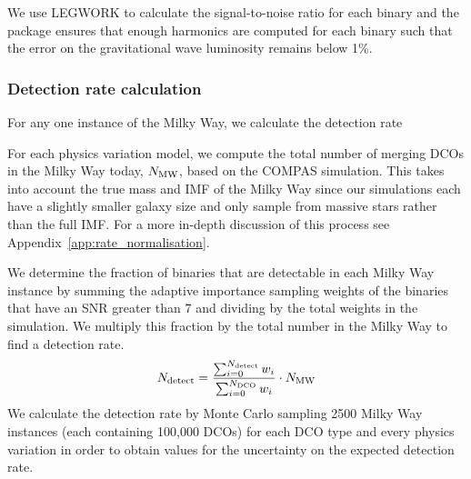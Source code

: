 We use LEGWORK to calculate the signal-to-noise ratio for each binary and the package ensures that enough harmonics are computed for each binary such that the error on the gravitational wave luminosity remains below 1\%.

\subsubsection{Detection rate calculation}
For any one instance of the Milky Way, we calculate the detection rate 

For each physics variation model, we compute the total number of merging DCOs in the Milky Way today, $N_{\rm MW}$, based on the COMPAS simulation. This takes into account the true mass and IMF of the Milky Way since our simulations each have a slightly smaller galaxy size and only sample from massive stars rather than the full IMF. For a more in-depth discussion of this process see Appendix~\ref{app:rate_normalisation}.

We determine the fraction of binaries that are detectable in each Milky Way instance by summing the adaptive importance sampling weights of the binaries that have an SNR greater than 7 and dividing by the total weights in the simulation. We multiply this fraction by the total number in the Milky Way to find a detection rate.
\begin{equation}
    N_{\rm detect} = \frac{\sum_{i = 0}^{N_{\rm detect}} w_i}{\sum_{i = 0}^{N_{\rm DCO}} w_i} \cdot N_{\rm MW}
\end{equation}
We calculate the detection rate by Monte Carlo sampling 2500 Milky Way instances (each containing 100,000 DCOs) for each DCO type and every physics variation in order to obtain values for the uncertainty on the expected detection rate.